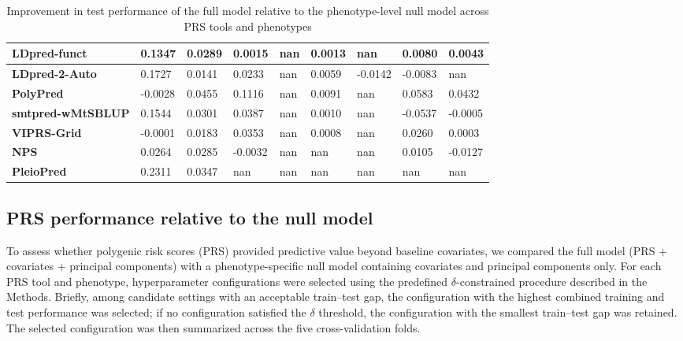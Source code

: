 \documentclass[pdflatex,sn-basic]{sn-jnl}
\begin{document}
\begin{table}[!ht]
{\begin{tabular}{|l|l|l|l|l|l|l|l|l|}
\hline
\textbf{LDpred-funct} & \cellcolor[HTML]{D3DF82}0.1347 & \cellcolor[HTML]{FEE783}0.0289 & \cellcolor[HTML]{FCB679}0.0015 & nan & \cellcolor[HTML]{FEE883}0.0013 & nan & \cellcolor[HTML]{FFEB84}0.0080 & \cellcolor[HTML]{F5E884}0.0043 \\
\hline
\textbf{LDpred-2-Auto} & \cellcolor[HTML]{B4D680}0.1727 & \cellcolor[HTML]{FCC57C}0.0141 & \cellcolor[HTML]{FEE081}0.0233 & nan & \cellcolor[HTML]{FEEA83}0.0059 & \cellcolor[HTML]{E6E483}-0.0142 & \cellcolor[HTML]{FDC87D}-0.0083 & nan \\
\hline
\textbf{PolyPred} & \cellcolor[HTML]{FDCB7D}-0.0028 & \cellcolor[HTML]{B2D580}0.0455 & \cellcolor[HTML]{63BE7B}0.1116 & nan & \cellcolor[HTML]{F9EA84}0.0091 & nan & \cellcolor[HTML]{A0D07F}0.0583 & \cellcolor[HTML]{92CC7E}0.0432 \\
\hline
\textbf{smtpred-wMtSBLUP} & \cellcolor[HTML]{C3DA81}0.1544 & \cellcolor[HTML]{FEE983}0.0301 & \cellcolor[HTML]{EDE683}0.0387 & nan & \cellcolor[HTML]{FEE883}0.0010 & nan & \cellcolor[HTML]{F8696B}-0.0537 & \cellcolor[HTML]{FEE683}-0.0005 \\
\hline
\textbf{VIPRS-Grid} & \cellcolor[HTML]{FDCC7E}-0.0001 & \cellcolor[HTML]{FDCF7E}0.0183 & \cellcolor[HTML]{F3E884}0.0353 & nan & \cellcolor[HTML]{FEE883}0.0008 & nan & \cellcolor[HTML]{DDE283}0.0260 & \cellcolor[HTML]{FFEB84}0.0003 \\
\hline
\textbf{NPS} & \cellcolor[HTML]{FDD680}0.0264 & \cellcolor[HTML]{FEE683}0.0285 & \cellcolor[HTML]{FBAD78}-0.0032 & nan & nan & nan & \cellcolor[HTML]{FBEA84}0.0105 & \cellcolor[HTML]{FA9673}-0.0127 \\
\hline
\textbf{PleioPred} & \cellcolor[HTML]{86C87D}0.2311 & \cellcolor[HTML]{EAE583}0.0347 & nan & nan & nan & nan & nan & nan \\
\hline
\end{tabular}%
}
\caption{Improvement in test performance of the full model relative to the phenotype-level null model across PRS tools and phenotypes}
\label{TablePRSImprovement}
\end{table}


\subsection*{PRS performance relative to the null model}

To assess whether polygenic risk scores (PRS) provided predictive value beyond baseline covariates, we compared the full model (PRS + covariates + principal components) with a phenotype-specific null model containing covariates and principal components only. For each PRS tool and phenotype, hyperparameter configurations were selected using the predefined $\delta$-constrained procedure described in the Methods. Briefly, among candidate settings with an acceptable train--test gap, the configuration with the highest combined training and test performance was selected; if no configuration satisfied the $\delta$ threshold, the configuration with the smallest train--test gap was retained. The selected configuration was then summarized across the five cross-validation folds.
\end{document}
